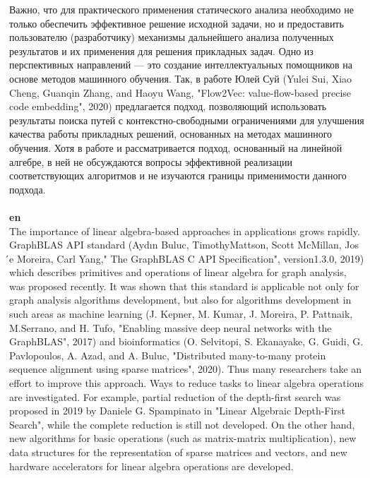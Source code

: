 \documentclass[12pt]{article}  %
\theoremstyle{remark}
\begin{document}
Важно, что для практического применения статического анализа необходимо не только обеспечить эффективное решение исходной задачи, но и предоставить пользователю (разработчику) механизмы дальнейшего анализа полученных результатов и их применения для решения прикладных задач. Одно из перспективных направлений --- это создание интеллектуальных помощников на основе методов машинного обучения. Так, в работе Юлей Суй (Yulei Sui, Xiao Cheng, Guanqin Zhang, and Haoyu Wang, "Flow2Vec: value-flow-based precise code embedding", 2020) предлагается подход, позволяющий использовать результаты поиска путей с контекстно-свободными ограничениями для улучшения качества работы прикладных решений, основанных на методах машинного обучения. Хотя в работе и рассматривается подход, основанный на линейной алгебре, в ней не обсуждаются вопросы эффективной реализации соответствующих алгоритмов и не изучаются границы применимости данного подхода.
\\
\\
\textbf{en}\\

The importance of linear algebra-based approaches in applications grows rapidly. GraphBLAS API standard (Aydın Buluc, TimothyMattson, Scott McMillan, Jos ́e Moreira, Carl Yang," The GraphBLAS C API Specification", version1.3.0, 2019) which describes primitives and operations of linear algebra for graph analysis, was proposed recently. It was shown that this standard is applicable not only for graph analysis algorithms development, but also for algorithms development in such areas as machine learning (J. Kepner, M. Kumar, J. Moreira, P. Pattnaik, M.Serrano, and H. Tufo, "Enabling massive deep neural networks with the GraphBLAS", 2017) and bioinformatics (O. Selvitopi, S. Ekanayake, G. Guidi, G. Pavlopoulos, A. Azad, and A. Buluc, "Distributed many-to-many protein sequence alignment using sparse matrices", 2020). Thus many researchers take an effort to improve this approach. Ways to reduce tasks to linear algebra operations are investigated. For example, partial reduction of the depth-first search was proposed in 2019 by Daniele G. Spampinato in "Linear Algebraic Depth-First Search", while the complete reduction is still not developed. On the other hand, new algorithms for basic operations (such as matrix-matrix multiplication), new data structures for the representation of sparse matrices and vectors, and new hardware accelerators for linear algebra operations are developed.
\end{document}
